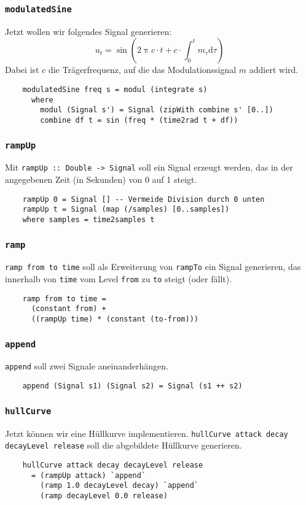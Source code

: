 \documentclass{beamer}
\begin{document}
\begin{frame}[fragile]
  \frametitle{\lstinline{modulatedSine}}
  Jetzt wollen wir folgendes Signal generieren:
  \[u_t = \sin\left(2 \uppi c \cdot t + c \cdot \int_0^t m_τ \mathrm dτ\right)\]
  Dabei ist $c$ die Trägerfrequenz, auf die das Modulationssignal $m$ addiert wird.
  \pause
  \begin{lstlisting}
    modulatedSine freq s = modul (integrate s)
      where
        modul (Signal s') = Signal (zipWith combine s' [0..])
        combine df t = sin (freq * (time2rad t + df))
  \end{lstlisting}
\end{frame}

\begin{frame}[fragile]
  \frametitle{\lstinline{rampUp}}
  Mit \lstinline{rampUp :: Double -> Signal} soll ein Signal erzeugt werden,
  das in der angegebenen Zeit (in Sekunden) von 0 auf 1 steigt.
  
  \pause
  \begin{lstlisting}
    rampUp 0 = Signal [] -- Vermeide Division durch 0 unten
    rampUp t = Signal (map (/samples) [0..samples])
    where samples = time2samples t
  \end{lstlisting}
\end{frame}

\begin{frame}[fragile]
  \frametitle{\lstinline{ramp}}
  \lstinline{ramp from to time} soll als Erweiterung von \lstinline{rampTo} ein Signal generieren,
  das innerhalb von \lstinline{time} vom Level \lstinline{from} zu \lstinline{to} steigt (oder fällt).
  \pause
  \begin{lstlisting}
    ramp from to time =
      (constant from) +
      ((rampUp time) * (constant (to-from)))
  \end{lstlisting}
\end{frame}

\begin{frame}[fragile]
  \frametitle{\lstinline{append}}
  \lstinline{append} soll zwei Signale aneinanderhängen.
  \pause
  \begin{lstlisting}
    append (Signal s1) (Signal s2) = Signal (s1 ++ s2)
  \end{lstlisting}
\end{frame}

\begin{frame}[fragile]
  \frametitle{\lstinline{hullCurve}}
  Jetzt können wir eine Hüllkurve implementieren.
  \lstinline{hullCurve attack decay decayLevel release}
  soll die abgebildete Hüllkurve generieren.
  
  \pause
  \begin{lstlisting}
    hullCurve attack decay decayLevel release
      = (rampUp attack) `append`
        (ramp 1.0 decayLevel decay) `append`
        (ramp decayLevel 0.0 release)
  \end{lstlisting}
\end{frame}
\end{document}
